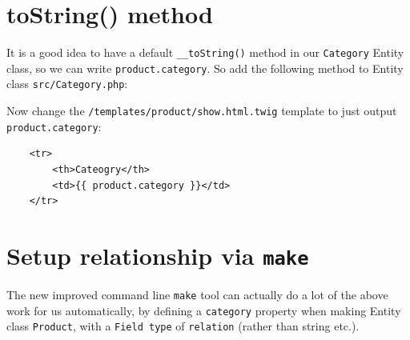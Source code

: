 \documentclass[a4paperpaper,openright]{book}
\newenvironment{Shaded}{}{}
\newcommand{\FunctionTok}[1]{\textcolor[rgb]{0.02,0.16,0.49}{#1}}
\newcommand{\KeywordTok}[1]{\textcolor[rgb]{0.00,0.44,0.13}{\textbf{#1}}}
\newcommand{\NormalTok}[1]{#1}
\newcommand{\OtherTok}[1]{\textcolor[rgb]{0.00,0.44,0.13}{#1}}
\begin{document}
\hypertarget{tostring-method}{%
\section{toString() method}\label{tostring-method}}

It is a good idea to have a default \texttt{\_\_toString()} method in
our \texttt{Category} Entity class, so we can write
\texttt{product.category}. So add the following method to Entity class
\texttt{src/Category.php}:

\begin{Shaded}
\end{Shaded}

Now change the \texttt{/templates/product/show.html.twig} template to
just output \texttt{product.category}:

\begin{verbatim}
    <tr>
        <th>Cateogry</th>
        <td>{{ product.category }}</td>
    </tr>
\end{verbatim}

\hypertarget{setup-relationship-via-make}{%
\section{\texorpdfstring{Setup relationship via
\texttt{make}}{Setup relationship via make}}\label{setup-relationship-via-make}}

The new improved command line \texttt{make} tool can actually do a lot
of the above work for us automatically, by defining a \texttt{category}
property when making Entity class \texttt{Product}, with a
\texttt{Field\ type} of \texttt{relation} (rather than string etc.).
\end{document}
